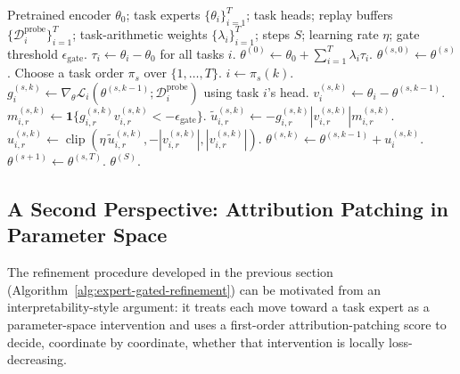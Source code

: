 \documentclass[11pt]{article}
\newcommand{\thetab}{\theta_0}
\newcommand{\taskvec}{\tau}
\newcommand{\loss}{\mathcal{L}}
\newcommand{\data}{\mathcal{D}}
\newcommand{\ind}{\mathbf{1}}
\DeclareMathOperator{\clip}{clip}
\begin{document}
\begin{algorithm}[H]
\caption{Sequential expert-direction-gated replay refinement}
\label{alg:expert-gated-refinement}
\begin{algorithmic}[1]
\Require Pretrained encoder $\thetab$; task experts $\{\theta_i\}_{i=1}^T$; task heads; replay buffers $\{\data_i^{\mathrm{probe}}\}_{i=1}^T$; task-arithmetic weights $\{\lambda_i\}_{i=1}^T$; steps $S$; learning rate $\eta$; gate threshold $\epsilon_{\mathrm{gate}}$.
\State $\taskvec_i \gets \theta_i-\thetab$ for all tasks $i$.
\State $\theta^{(0)} \gets \thetab + \sum_{i=1}^{T}\lambda_i\taskvec_i$.
    \State $\theta^{(s,0)} \gets \theta^{(s)}$.
    \State Choose a task order $\pi_s$ over $\{1,\ldots,T\}$.
        \State $i \gets \pi_s(k)$.
        \State $g_i^{(s,k)} \gets \nabla_\theta \loss_i(\theta^{(s,k-1)};\data_i^{\mathrm{probe}})$ using task $i$'s head.
        \State $v_i^{(s,k)} \gets \theta_i - \theta^{(s,k-1)}$.
            \State $m_{i,r}^{(s,k)} \gets \ind\{g_{i,r}^{(s,k)}v_{i,r}^{(s,k)} < -\epsilon_{\mathrm{gate}}\}$.
            \State $\widetilde u_{i,r}^{(s,k)} \gets -g_{i,r}^{(s,k)} |v_{i,r}^{(s,k)}| m_{i,r}^{(s,k)}$.
            \State $u_{i,r}^{(s,k)} \gets \clip(\eta\,\widetilde u_{i,r}^{(s,k)},- |v_{i,r}^{(s,k)}|, |v_{i,r}^{(s,k)}|)$. 
        \EndFor
        \State $\theta^{(s,k)} \gets \theta^{(s,k-1)} + u_i^{(s,k)}$.
    \EndFor
    \State $\theta^{(s+1)} \gets \theta^{(s,T)}$.
\EndFor
\State \Return $\theta^{(S)}$.
\end{algorithmic}
\end{algorithm}


\subsection{A Second Perspective: Attribution Patching in Parameter Space}
\label{sec:ap-view}
The refinement procedure developed in the previous section (Algorithm~\ref{alg:expert-gated-refinement}) can be motivated from an interpretability-style argument: it treats each move toward a task expert as a parameter-space intervention and uses a first-order attribution-patching score to decide, coordinate by coordinate, whether that intervention is locally loss-decreasing.
\end{document}
